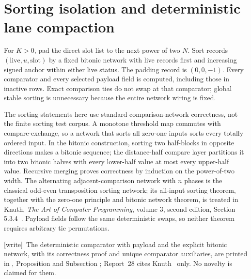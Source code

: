 \documentclass[11pt,a4paper]{article}
\numberwithin{equation}{section}
\newcommand{\wtag}{\textup{[write]}}
\begin{document}
\section{Sorting isolation and deterministic lane compaction}\label{fpa:pq:sec:sorting}
For $K>0$, pad the direct slot list to the next power of two $N$. Sort records $(\mathrm{live},u,\mathrm{slot})$ by a fixed bitonic network with live records first and increasing signed anchor within either live status. The padding record is $(0,0,-1)$. Every comparator and every selected payload field is computed, including those in inactive rows. Exact comparison ties do not swap at that comparator; global stable sorting is unnecessary because the entire network wiring is fixed.

The sorting statements here use standard comparison-network correctness, not the finite sorting test corpus. A monotone threshold map commutes with compare-exchange, so a network that sorts all zero-one inputs sorts every totally ordered input. In the bitonic construction, sorting two half-blocks in opposite directions makes a bitonic sequence; the distance-half compare layer partitions it into two bitonic halves with every lower-half value at most every upper-half value. Recursive merging proves correctness by induction on the power-of-two width. The alternating adjacent-comparison network with $n$ phases is the classical odd-even transposition sorting network; its all-input sorting theorem, together with the zero-one principle and bitonic network theorem, is treated in Knuth, \emph{The Art of Computer Programming}, volume 3, second edition, Section 5.3.4~\cite{fpa:knuth}. Payload fields follow the same deterministic swaps, so neither theorem requires arbitrary tie permutations.

\wtag\ The deterministic comparator with payload and the explicit bitonic network, with its correctness proof and unique comparator auxiliaries, are printed in , Proposition  and Subsection ; Report~28 cites Knuth~\cite{fpa:knuth} only. No novelty is claimed for them.
\end{document}
